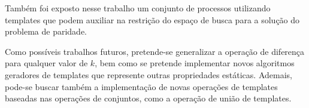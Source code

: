 Também foi exposto nesse trabalho um conjunto de processos utilizando templates que podem auxiliar na restrição do espaço de busca para a solução do problema de paridade.

Como possíveis trabalhos futuros, pretende-se generalizar a operação de diferença para qualquer valor de $k$, bem como se pretende implementar novos algoritmos geradores de templates que represente outras propriedades estáticas. Ademais, pode-se buscar também a implementação de novas operações de templates baseadas nas operações de conjuntos, como a operação de união de templates.
